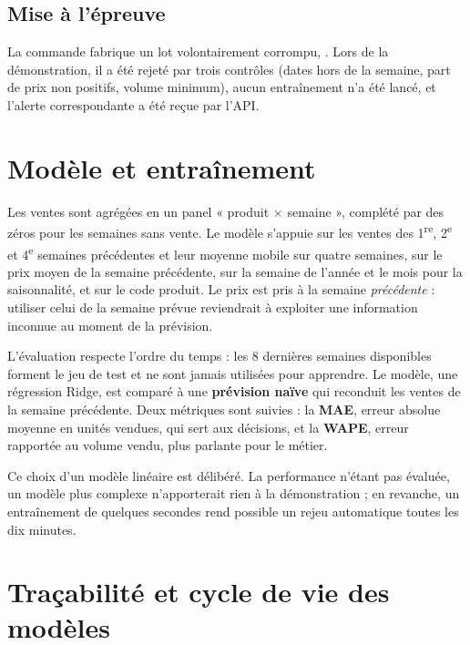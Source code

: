 \documentclass[11pt,a4paper]{article}
\newcommand{\code}[1]{\texttt{\detokenize{#1}}}
\begin{document}
\subsection{Mise à l'épreuve}

La commande \code{retail quality --invalid-demo} fabrique un lot volontairement corrompu,
\code{2099-W01}. Lors de la démonstration, il a été rejeté par trois contrôles
(dates hors de la semaine, part de prix non positifs, volume minimum), aucun entraînement
n'a été lancé, et l'alerte correspondante a été reçue par l'API.

\section{Modèle et entraînement}\label{sec:modele}

Les ventes sont agrégées en un panel « produit $\times$ semaine », complété par des zéros
pour les semaines sans vente. Le modèle s'appuie sur les ventes des 1\textsuperscript{re},
2\textsuperscript{e} et 4\textsuperscript{e} semaines précédentes et leur moyenne mobile sur
quatre semaines, sur le prix moyen de la semaine précédente, sur la semaine de l'année et le
mois pour la saisonnalité, et sur le code produit. Le prix est pris à la semaine
\emph{précédente} : utiliser celui de la semaine prévue reviendrait à exploiter une
information inconnue au moment de la prévision.

L'évaluation respecte l'ordre du temps : les 8 dernières semaines disponibles forment le jeu
de test et ne sont jamais utilisées pour apprendre. Le modèle, une régression Ridge, est
comparé à une \textbf{prévision naïve} qui reconduit les ventes de la semaine précédente.
Deux métriques sont suivies : la \textbf{MAE}, erreur absolue moyenne en unités vendues, qui
sert aux décisions, et la \textbf{WAPE}, erreur rapportée au volume vendu, plus parlante pour
le métier.

Ce choix d'un modèle linéaire est délibéré. La performance n'étant pas évaluée, un modèle
plus complexe n'apporterait rien à la démonstration ; en revanche, un entraînement de
quelques secondes rend possible un rejeu automatique toutes les dix minutes.

\section{Traçabilité et cycle de vie des modèles}\label{sec:registre}
\end{document}
